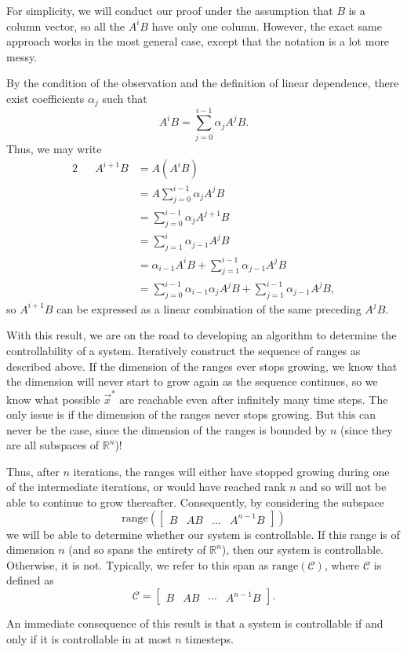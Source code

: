 \documentclass[letterpaper]{article}
\theoremstyle{remark}
\newcommand{\mat}[1]{\ensuremath{\begin{bmatrix}#1\end{bmatrix}}}
\newcommand{\eqn}[1]{\begin{alignat*}{2}#1\end{alignat*}}
\begin{document}
For simplicity, we will conduct our proof under the assumption that $B$ is a column vector, so all the $A^iB$ have only one column. However, the exact same approach works in the most general case, except that the notation is a lot more messy.

By the condition of the observation and the definition of linear dependence, there exist coefficients $\alpha_j$ such that
\[
    A^iB = \sum_{j = 0}^{i - 1} \alpha_j A^{j}B.
\]
Thus, we may write
\eqn{
    && A^{i + 1}B &= A(A^iB) \\
    &&&= A\sum_{j = 0}^{i - 1} \alpha_j A^{j}B \\
    &&&= \sum_{j=0}^{i-1}\alpha_jA^{j+1}B \\
    &&&= \sum_{j=1}^{i}\alpha_{j-1}A^jB \\
    &&&= \alpha_{i-1}A^iB + \sum_{j=1}^{i - 1}\alpha_{j-1}A^jB \\
    &&&= \sum_{j = 0}^{i - 1} \alpha_{i-1}\alpha_j A^{j}B + \sum_{j=1}^{i - 1}\alpha_{j-1}A^jB,
}
so $A^{i+1}B$ can be expressed as a linear combination of the same preceding $A^jB$.

With this result, we are on the road to developing an algorithm to determine the controllability of a system. Iteratively construct the sequence of ranges as described above. If the dimension of the ranges ever stops growing, we know that the dimension will never start to grow again as the sequence continues, so we know what possible $\vec{x}^*$ are reachable even after infinitely many time steps. The only issue is if the dimension of the ranges never stops growing. But this can never be the case, since the dimension of the ranges is bounded by $n$ (since they are all subspaces of $\mathbb{R}^n$)!

Thus, after $n$ iterations, the ranges will either have stopped growing during one of the intermediate iterations, or would have reached rank $n$ and so will not be able to continue to grow thereafter. Consequently, by considering the subspace
\[
    \text{range}(\mat{B & AB & \ldots & A^{n-1}B})
\]
we will be able to determine whether our system is controllable. If this range is of dimension $n$ (and so spans the entirety of $\mathbb{R}^n$), then our system is controllable. Otherwise, it is not. Typically, we refer to this span as $\text{range}(\mathscr{C})$, where $\mathscr{C}$ is defined as
\[
    \mathscr{C} = \mat{B & AB & \cdots & A^{n - 1}B}.
\]

An immediate consequence of this result is that a system is controllable if and only if it is controllable in at most $n$ timesteps.
\end{document}
